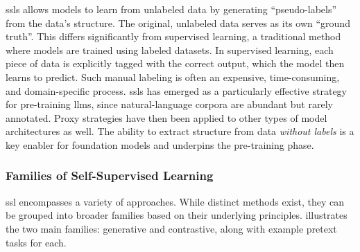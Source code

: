 \glspl{ssl} allows models to learn from unlabeled data by generating \enquote{pseudo-labels} from the data's structure. 
The original, unlabeled data serves as its own \enquote{ground truth}. 
This differs significantly from supervised learning, a traditional method where models are trained using labeled datasets. 
In supervised learning, each piece of data is explicitly tagged with the correct output, which the model then learns to predict. 
Such manual labeling is often an expensive, time-consuming, and domain-specific process. 
\glspl{ssl} has emerged as a particularly effective strategy for pre-training \glspl{llm}, since natural-language corpora are abundant but rarely annotated. 
Proxy strategies have then been applied to other types of model architectures as well. 
The ability to extract structure from data \textit{without labels} is a key enabler for foundation models and underpins the pre-training phase.

\subsubsection{Families of Self-Supervised Learning}

\gls{ssl} encompasses a variety of approaches. While distinct methods exist, they can be grouped into broader families based on their underlying principles.  illustrates the two main families: generative and contrastive, along with example pretext tasks for each.

